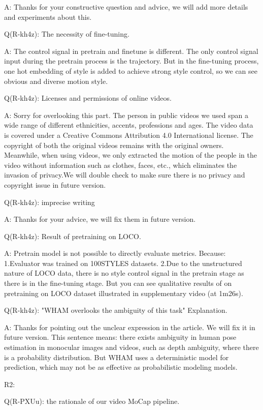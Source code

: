 \documentclass{article}
\begin{document}
A: Thanks for your constructive question and advice, we will add more details and experiments about this. 

Q(R-kh4z): The necessity of fine-tuning.

A: The control signal in pretrain and finetune is different. The only control signal input during the pretrain process is the trajectory. But in the fine-tuning process, one hot embedding of style is added to achieve strong style control, so we can see obvious and diverse motion style.

Q(R-kh4z): Licenses and permissions of online videos.

A: Sorry for overlooking this part. The person in public videos we used span a wide range of different ethnicities, accents, professions and ages. The video data is covered under a Creative Commons Attribution 4.0 International license. The copyright of both the original videos remains with the original owners. Meanwhile, when using videos, we only extracted the motion of the people in the video without information such as clothes, faces, etc., which eliminates the invasion of privacy.We will double check to make sure there is no privacy and copyright issue in future version.

Q(R-kh4z): imprecise writing

A: Thanks for your advice, we will fix them in future version.

Q(R-kh4z): Result of pretraining on LOCO.

A: Pretrain model is not possible to directly evaluate metrics. Because: 1.Evaluator was trained on 100STYLES datasets. 2.Due to the unstructured nature of LOCO data, there is no style control signal in the pretrain stage as there is in the fine-tuning stage. But you can see qualitative results of on pretraining on LOCO dataset illustrated in supplementary video (at 1m26s).

Q(R-kh4z): "WHAM overlooks the ambiguity of this task" Explanation.

A: Thanks for pointing out the unclear expression in the article. We will fix it in future version. This sentence means: there exists ambiguity in human pose estimation in monocular images and videos, such as depth ambiguity, where there is a probability distribution. But WHAM uses a deterministic model for prediction, which may not be as effective as probabilistic modeling models.

R2:


Q(R-PXUu): the rationale of our video MoCap pipeline.
\end{document}
